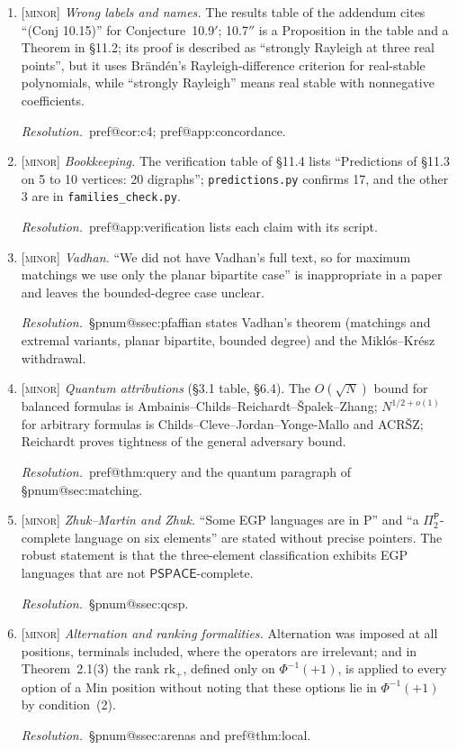 \documentclass[11pt]{amsart}
\makeatletter
\newcommand{\pref}[1]{\csname pref@#1\endcsname}
\newcommand{\pnum}[1]{\csname pnum@#1\endcsname}
\newcommand{\PSPACE}{\mathsf{PSPACE}}
\newcommand{\Pclass}{\mathsf{P}}
\newcommand{\sev}[1]{\textsc{[#1]}}
\newcommand{\fix}{\par\noindent\emph{Resolution.}\ }
\makeatother
\begin{document}
\begin{enumerate}[label=\textbf{I.\arabic*},leftmargin=*,widest=I.22]
\item \sev{minor} \emph{Wrong labels and names.} The results table of the addendum cites ``(Conj 10.15)'' for Conjecture~10.9$'$; 10.7$''$ is a Proposition in the table and a Theorem in \S11.2; its proof is described as ``strongly Rayleigh at three real points'', but it uses Br\"and\'en's Rayleigh-difference criterion for real-stable polynomials, while ``strongly Rayleigh'' means real stable with nonnegative coefficients.
\fix \pref{cor:c4}; \pref{app:concordance}.

\item \sev{minor} \emph{Bookkeeping.} The verification table of \S11.4 lists ``Predictions of \S11.3 on 5 to 10 vertices: 20 digraphs''; \texttt{predictions.py} confirms 17, and the other 3 are in \texttt{families\_check.py}.
\fix \pref{app:verification} lists each claim with its script.

\item \sev{minor} \emph{Vadhan.} ``We did not have Vadhan's full text, so for maximum matchings we use only the planar bipartite case'' is inappropriate in a paper and leaves the bounded-degree case unclear.
\fix \S\pnum{ssec:pfaffian} states Vadhan's theorem (matchings and extremal variants, planar bipartite, bounded degree) and the Mikl\'os--Kr\'esz withdrawal.

\item \sev{minor} \emph{Quantum attributions} (\S3.1 table, \S6.4). The $O(\sqrt N)$ bound for balanced formulas is Ambainis--Childs--Reichardt--\v{S}palek--Zhang; $N^{1/2+o(1)}$ for arbitrary formulas is Childs--Cleve--Jordan--Yonge-Mallo and ACR\v{S}Z; Reichardt proves tightness of the general adversary bound.
\fix \pref{thm:query} and the quantum paragraph of \S\pnum{sec:matching}.

\item \sev{minor} \emph{Zhuk--Martin and Zhuk.} ``Some EGP languages are in P'' and ``a $\Pi_2^{\Pclass}$-complete language on six elements'' are stated without precise pointers. The robust statement is that the three-element classification exhibits EGP languages that are not $\PSPACE$-complete.
\fix \S\pnum{ssec:qcsp}.

\item \sev{minor} \emph{Alternation and ranking formalities.} Alternation was imposed at all positions, terminals included, where the operators are irrelevant; and in Theorem~2.1(3) the rank $\mathrm{rk}_{+}$, defined only on $\Phi^{-1}(+1)$, is applied to every option of a Min position without noting that these options lie in $\Phi^{-1}(+1)$ by condition~(2).
\fix \S\pnum{ssec:arenas} and \pref{thm:local}.


\end{enumerate}
\end{document}
